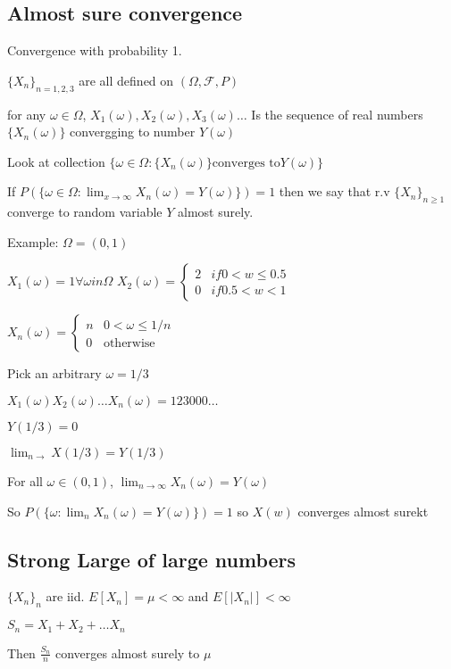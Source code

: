 \documentclass{article}
\begin{document}
\subsection*{Almost sure convergence}
Convergence with probability 1.

$\{X_n\}_{n=1,2,3}$ are all defined on $(\Omega, \mathcal{F}, P)$

for any $\omega \in \Omega$, $X_1(\omega), X_2(\omega), X_3(\omega) \dots$ 
Is the sequence of real numbers $\{ X_n(\omega) \}$ convergging to number $Y(\omega)$

Look at collection $\{\omega \in \Omega: \{X_n(\omega)\} \text{converges to} Y(\omega)  \}$

If $P(\{ \omega  \in \Omega: \lim_{x\longrightarrow \infty} X_n(\omega) = Y(\omega) \})= 1$ then we say that r.v $\{ X_n\}_{n \geq 1}$ converge to random variable $Y$ almost surely.

Example: $\Omega = (0,1)$

$X_1(\omega) =1  \forall \omega in \Omega$
$X_2(\omega) = \begin{cases}
2 & if 0 < w \leq 0.5\\
0 & if 0.5 < w < 1

\end{cases}$

$X_n(\omega) = \begin{cases} n & 0 < \omega \leq 1/n\\ 
0 & \text{otherwise}
\end{cases}$

Pick an arbitrary $\omega=1/3$

$X_1(\omega) X_2(\omega) \dots X_n(\omega)  = 123000\dots$


$Y(1/3) = 0$

$\lim_{n \longrightarrow} X(1/3) = Y(1/3)$

For all $\omega \in (0,1)$, $\lim_{n \longrightarrow \infty} X_n(\omega) = Y(\omega)$

So $P(\{\omega : \lim_{n} X_n(\omega) = Y(\omega)  \})=1$ so $X(w)$ converges almost surekt 


\subsection{Strong Large of large numbers}

$\{ X_n \}_n$ are iid. $E[X_n] = \mu < \infty$ and $E[|X_n| ] < \infty$

$S_n = X_1+X_2+ \dots X_n$

Then $\frac{S_n}{n}$ converges almost surely to $\mu$
\end{document}
